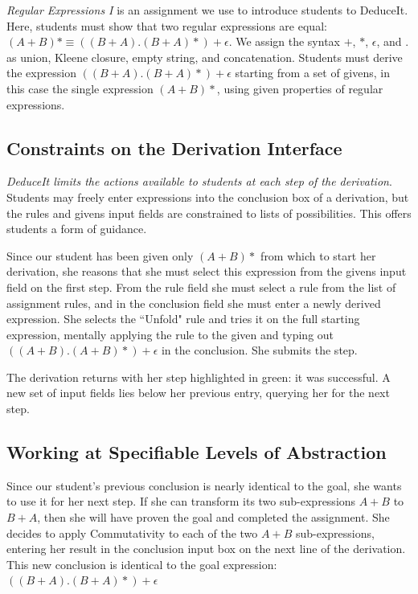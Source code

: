 \documentclass{sigchi}
\begin{document}
\textit{Regular Expressions I} is an assignment we use to introduce students to DeduceIt. Here, students must show that two regular expressions are equal: $(A+B)* \equiv ((B+A).(B+A)*)+\epsilon$. We assign the syntax $+$, $*$, $\epsilon$, and $.$ as union, Kleene closure, empty string, and concatenation. Students must derive the expression $((B+A).(B+A)*)+\epsilon$ starting from a set of givens, in this case the single expression $(A+B)*$, using given properties of regular expressions.

\subsection{Constraints on the Derivation Interface}

\textit{DeduceIt limits the actions available to students at each step of the derivation}. Students may freely enter expressions into the conclusion box of a derivation, but the rules and givens input fields are constrained to lists of possibilities. This offers students a form of guidance.

Since our student has been given only $(A+B)*$ from which to start her derivation, she reasons that she must select this expression from the givens input field on the first step. From the rule field she must select a rule from the list of assignment rules, and in the conclusion field she must enter a newly derived expression. She selects the ``Unfold" rule and tries it on the full starting expression, mentally applying the rule to the given and typing out $((A + B).(A + B)*)+\epsilon$ in the conclusion. She submits the step. 

The derivation returns with her step highlighted in green: it was successful. A new set of input fields lies below her previous entry, querying her for the next step.

\subsection{Working at Specifiable Levels of Abstraction}
Since our student's previous conclusion is nearly identical to the goal, she wants to use it for her next step. If she can transform its two sub-expressions $A+B$ to $B+A$, then she will have proven the goal and completed the assignment. She decides to apply Commutativity to each of the two $A+B$ sub-expressions, entering her result in the conclusion input box on the next line of the derivation. This new conclusion is identical to the goal expression: $((B+A).(B+A)*)+\epsilon$
\end{document}
